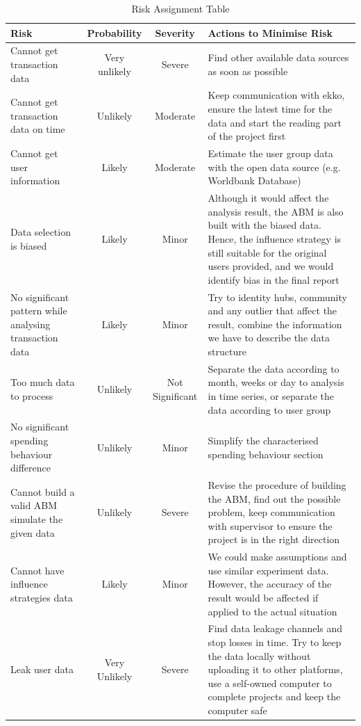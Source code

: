 \documentclass[a4paper,11pt]{article}
\begin{document}
\begin{table}[htbp]
    \begin{center}
        \begin{tabularx}{\textwidth}{|p{4cm}|c|c|X|}
        \hline
        \textbf{Risk} & \textbf{Probability}  & \textbf{Severity}  & \textbf{Actions to Minimise Risk} \\
        \hline
        Cannot get transaction data & Very unlikely & Severe & Find other available data sources as soon as possible \\
        \hline
Cannot get transaction data on time & Unlikely & Moderate & Keep communication with ekko, ensure the latest time for the data and start the reading part of the project first \\
\hline
Cannot get user information & Likely & Moderate & Estimate the user group data with the open data source (e.g. Worldbank Database) \\
\hline
Data selection is biased & Likely & Minor & Although it would affect the analysis result, the ABM is also built with the biased data. Hence, the influence strategy is still suitable for the original users provided, and we would identify bias in the final report \\
\hline
No significant pattern while analysing transaction data & Likely & Minor & Try to identity hubs, community and any outlier that affect the result, combine the information we have to describe the data structure \\
\hline
Too much data to process & Unlikely & Not Significant & Separate the data according to month, weeks or day to analysis in time series, or separate the data according to user group \\
\hline
No significant spending behaviour difference & Unlikely & Minor & Simplify the characterised spending behaviour section \\
\hline
Cannot build a valid ABM simulate the given data & Unlikely & Severe & Revise the procedure of building the ABM, find out the possible problem, keep communication with supervisor to ensure the project is in the right direction \\
\hline
Cannot have influence strategies data & Likely & Minor & We could make assumptions and use similar experiment data. However, the accuracy of the result would be affected if applied to the actual situation \\
\hline
Leak user data & Very Unlikely & Severe & Find data leakage channels and stop losses in time. Try to keep the data locally without uploading it to other platforms, use a self-owned computer to complete projects and keep the computer safe \\
        \hline
        \end{tabularx} 
    \end{center}
    \caption{Risk Assignment Table}
    \label{risk_table}
\end{table}
\end{document}
